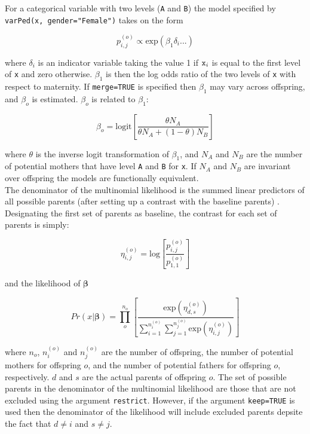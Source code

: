 \documentclass{article}
\begin{document}
For a categorical variable with two levels (\texttt{A} and \texttt{B}) the model specified by \texttt{varPed(x, gender="Female")} takes on the form

\begin{equation}
p^{(o)}_{i,j} \propto \textrm{exp}(\beta_{1}\delta_{i}...)
\end{equation}

where $\delta_{i}$ is an indicator variable taking the value 1 if $\textrm{\texttt{x}}_{i}$ is equal to the first level of \texttt{x} and zero otherwise. $\beta_{1}$ is then the log odds ratio of the two levels of \texttt{x} with respect to maternity.  If \texttt{merge=TRUE} is specified then $\beta_{1}$ may vary across offspring, and $\beta_{o}$ is estimated. $\beta_{o}$ is related to $\beta_{1}$:

\begin{equation}
\beta_{o}  = \textrm{logit}\left[\frac{\theta N_{A}}{\theta N_{A} + (1-\theta)N_{B}}\right]
\end{equation}

where $\theta$ is the inverse logit transformation of $\beta_{1}$, and $N_{A}$ and $N_{B}$ are the number of potential mothers that have level \texttt{A} and \texttt{B} for \texttt{x}. If $N_{A}$ and $N_{B}$ are invariant over offspring the models are functionally equivalent.\\

The denominator of the multinomial likelihood is the summed linear predictors of all possible parents (after setting up a contrast with the baseline parents) \citep{Smouse.1999}.  Designating the first set of parents as baseline, the contrast for each set of parents is simply:

\begin{equation}
\eta^{(o)}_{i,j}  = \textrm{log}\left[\frac{p^{(o)}_{i,j}}{p^{(o)}_{1,1}}\right]
\end{equation}

and the likelihood of $\bm{\beta}$

\begin{equation}
Pr(x|\bm{\beta})  = \prod^{n_{o}}_{o}\left[\frac{\textrm{exp}(\eta^{(o)}_{d,s})}{\sum^{n^{(o)}_{i}}_{i=1}\sum^{n^{(o)}_{j}}_{j=1}\textrm{exp}(\eta^{(o)}_{i,j})}\right] 
\end{equation}

where $n_{o}$, $n^{(o)}_{i}$ and $n^{(o)}_{j}$ are the number of offspring, the number of potential mothers for offspring $o$, and the number of potential fathers for offspring $o$, respectively.  $d$ and $s$ are the actual parents of offspring $o$. The set of possible parents  in the denominator of the multinomial likelihood are those that are not excluded using the argument \texttt{restrict}. However, if the argument \texttt{keep=TRUE} is used then the denominator of the likelihood will include excluded parents depsite the fact that $d \neq i$ and $s \neq j$.\\
\end{document}
